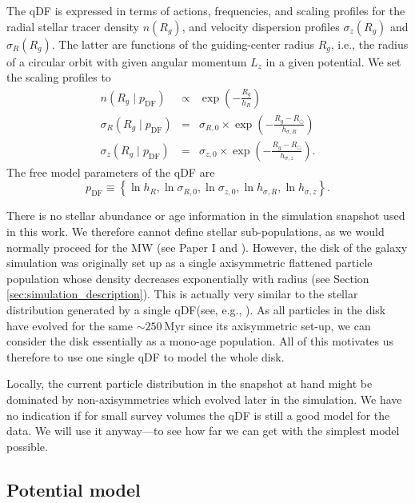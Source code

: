 \documentclass[iop,revtex4,numberedappendix,appendixfloats]{emulateapj}
\begin{document}
The qDF is expressed in terms of actions, frequencies, and scaling profiles for the radial stellar tracer density $n(R_g)$, and velocity dispersion profiles $\sigma_z(R_g)$ and $\sigma_R(R_g)$. The latter are functions of the guiding-center radius $R_g$, i.e., the radius of a circular orbit with given angular momentum $L_z$ in a given potential. We set the scaling profiles to
\begin{eqnarray}
n(R_g \mid p_\text{DF}) &\propto& \exp\left(-\frac{R_g}{h_R} \right)\\
\sigma_R(R_g \mid p_\text{DF}) &=& \sigma_{R,0} \times \exp\left(- \frac{R_g-R_\odot}{h_{\sigma,R}} \right)\label{eq:sigmaRRg}\\
\sigma_z(R_g \mid p_\text{DF}) &=& \sigma_{z,0} \times \exp\left(- \frac{R_g-R_\odot}{h_{\sigma,z}} \right)\label{eq:sigmazRg}.
\end{eqnarray}
The free model parameters of the qDF are
\begin{equation}
p_\text{DF} \equiv \left\{ \ln h_R, \ln \sigma_{R,0}, \ln \sigma_{z,0}, \ln h_{\sigma,R}, \ln h_{\sigma,z}\right\}. \label{eq:qDF_parameters}
\end{equation}

There is no stellar abundance or age information in the simulation snapshot used in this work. We therefore cannot define stellar sub-populations, as we would normally proceed for the MW (see Paper I and \citealt{2013ApJ...779..115B}). However, the disk of the galaxy simulation was originally set up as a single axisymmetric flattened particle population whose density decreases exponentially with radius (see Section \ref{sec:simulation_description}). This is actually very similar to the stellar distribution generated by a single qDF(see, e.g., \citealt{2013MNRAS.434..652T}). As all particles in the disk have evolved for the same $\sim 250~\text{Myr}$ since its axisymmetric set-up, we can consider the disk essentially as a mono-age population. All of this motivates us therefore to use one single qDF to model the whole disk.

Locally, the current particle distribution in the snapshot at hand might be dominated by non-axisymmetries which evolved later in the simulation. We have no indication if for small survey volumes the qDF is still a good model for the data. We will use it anyway---to see how far we can get with the simplest model possible.

\subsection{Potential model} \label{sec:potential_model}
\end{document}
